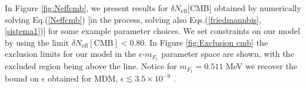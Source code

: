 \documentclass[12pt]{article}
\begin{document}

In Figure \ref{fig:Neffcmb}, we present results for $\delta N
_{\text{eff}}$[CMB] obtained by numerically solving 
Eq.(\ref{Neffcmb}) [in the process, solving also
Eqs.(\ref{friedmannbis},\ref{sistema1})] for some example parameter
choices. We set constraints on our model by using the limit $\delta N
_{\text{eff}}[\text{CMB}] < 0.80$. In Figure \ref{fig:Exclusion cmb} the
exclusion limits for our model in the $\epsilon$-$m _{F_1}$ parameter
space are shown, with the excluded region being above the line. Notice
for $m _{F_1} = 0.511$ MeV we recover the bound on $\epsilon$ obtained
for MDM, $\epsilon \lesssim 3.5 \times 10 ^{-9}$ \cite{predictions}.
\end{document}
